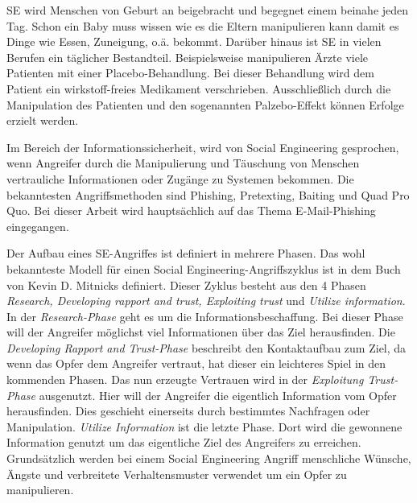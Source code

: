 	SE wird Menschen von Geburt an beigebracht und begegnet einem beinahe jeden Tag. Schon ein Baby muss wissen wie es die Eltern manipulieren kann damit es Dinge wie Essen, Zuneigung, o.ä. bekommt. Darüber hinaus ist SE in vielen Berufen ein täglicher Bestandteil. Beispielsweise manipulieren Ärzte viele Patienten mit einer Placebo-Behandlung. Bei dieser Behandlung wird dem Patient ein wirkstoff-freies Medikament verschrieben. Ausschließlich durch die Manipulation des Patienten und den sogenannten Palzebo-Effekt können Erfolge erzielt werden.
	
	Im Bereich der Informationssicherheit, wird von Social Engineering gesprochen, wenn Angreifer durch die Manipulierung und Täuschung von Menschen vertrauliche Informationen oder Zugänge zu Systemen bekommen. Die bekanntesten Angriffsmethoden sind Phishing, Pretexting, Baiting und Quad Pro Quo. Bei dieser Arbeit wird hauptsächlich auf das Thema E-Mail-Phishing eingegangen.

	Der Aufbau eines SE-Angriffes ist definiert in mehrere Phasen. Das wohl bekannteste Modell für einen Social Engineering-Angriffszyklus ist in dem Buch von Kevin D. Mitnicks \cite{ArtOfDeception} definiert. Dieser Zyklus besteht aus den 4 Phasen \textit{Research, Developing rapport and trust, Exploiting trust} und \textit{Utilize information}.\\
	In der \textit{Research-Phase} geht es um die Informationsbeschaffung. Bei dieser Phase will der Angreifer möglichst viel Informationen über das Ziel herausfinden. Die \textit{Developing Rapport and Trust-Phase} beschreibt den Kontaktaufbau zum Ziel, da wenn das Opfer dem Angreifer vertraut, hat dieser ein leichteres Spiel in den kommenden Phasen. Das nun erzeugte Vertrauen wird in der \textit{Exploitung Trust-Phase} ausgenutzt. Hier will der Angreifer die eigentlich Information vom Opfer herausfinden. Dies geschieht einerseits durch bestimmtes Nachfragen oder Manipulation.
	\textit{Utilize Information} ist die letzte Phase. Dort wird die gewonnene Information genutzt um das eigentliche Ziel des Angreifers zu erreichen.\\
	Grundsätzlich werden bei einem Social Engineering Angriff menschliche Wünsche, Ängste und verbreitete Verhaltensmuster verwendet um ein Opfer zu manipulieren.\cite{LeitfadenSE}\\

